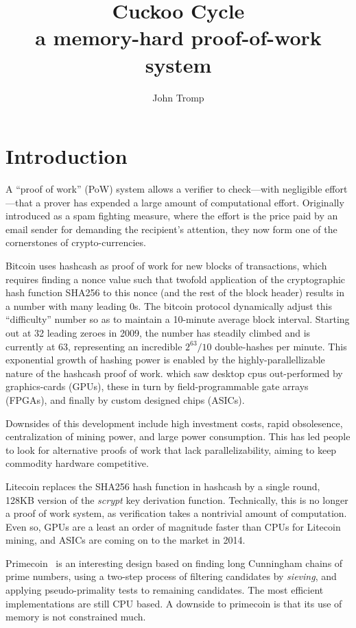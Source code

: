 \documentclass[11pt, oneside]{article}
\title{Cuckoo Cycle \protect\\ a memory-hard proof-of-work system}
\author{John Tromp}
\begin{document}
\maketitle
\section{Introduction}
A ``proof of work'' (PoW) system allows a verifier to check---with
negligible effort---that a prover has expended a large amount of computational effort.
Originally introduced as a spam fighting measure, 
where the effort is the price paid by an email sender for demanding the recipient's attention,
they now form one of the cornerstones of crypto-currencies.

Bitcoin\cite{nakamoto2009bitcoin} uses hashcash\cite{back2002} as proof of work for
new blocks of transactions, which requires finding a nonce value such that
twofold application of the cryptographic hash function SHA256
to this nonce (and the rest of the block header) results in a number with many
leading 0s.  The bitcoin protocol dynamically adjust this ``difficulty'' number
so as to maintain a 10-minute average block interval. Starting out at 32 leading zeroes in 2009,
the number has steadily climbed and is currently at 63, representing
an incredible $2^{63}/10$ double-hashes per minute. This exponential growth of hashing power
is enabled by the highly-parallellizable nature of the hashcash proof of work.
which saw desktop cpus out-performed by graphics-cards (GPUs),
these in turn by field-programmable gate arrays (FPGAs),
and finally by custom designed chips (ASICs).

Downsides of this development include high investment costs, rapid obsolesence,
centralization of mining power, and large power consumption.
This has led people to look for alternative proofs of work that lack parallelizability,
aiming to keep commodity hardware competitive.

Litecoin replaces the SHA256 hash function in hashcash by a single round, 128KB version of the
{\em scrypt} key derivation function. Technically, this is no longer a proof of work system, as
verification takes a nontrivial amount of computation. Even so, GPUs are a least an order
of magnitude faster than CPUs for Litecoin mining, and ASICs are coming on to the market in 2014.

Primecoin~\cite{king2013} is an interesting design based on finding long Cunningham chains
of prime numbers, using a two-step process of filtering candidates by {\em sieving}, and applying
pseudo-primality tests to remaining candidates. The most efficient implementations are still CPU based.
A downside to primecoin is that its use of memory is not constrained much.
\end{document}
